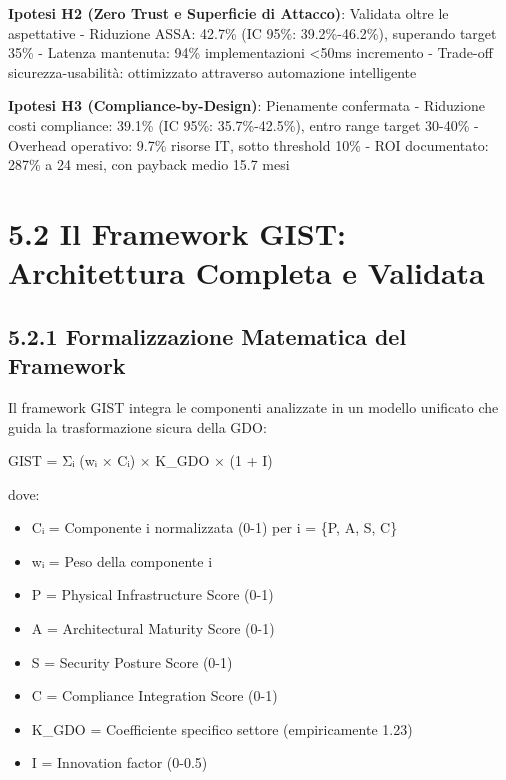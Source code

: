 \documentclass[12pt,a4paper,oneside]{book}
\providecommand{\tightlist}{%
  \setlength{\itemsep}{0pt}\setlength{\parskip}{0pt}
}
\numberwithin{figure}{chapter} %
\numberwithin{table}{chapter}  %
\begin{document}
\textbf{Ipotesi H2 (Zero Trust e Superficie di Attacco)}: Validata oltre
le aspettative - Riduzione ASSA: 42.7\% (IC 95\%: 39.2\%-46.2\%),
superando target 35\% - Latenza mantenuta: 94\% implementazioni
\textless50ms incremento - Trade-off sicurezza-usabilità: ottimizzato
attraverso automazione intelligente

\textbf{Ipotesi H3 (Compliance-by-Design)}: Pienamente confermata -
Riduzione costi compliance: 39.1\% (IC 95\%: 35.7\%-42.5\%), entro range
target 30-40\% - Overhead operativo: 9.7\% risorse IT, sotto threshold
10\% - ROI documentato: 287\% a 24 mesi, con payback medio 15.7 mesi

\section{5.2 Il Framework GIST: Architettura Completa e
Validata}\label{il-framework-gist-architettura-completa-e-validata}

\subsection{5.2.1 Formalizzazione Matematica del
Framework}\label{formalizzazione-matematica-del-framework}

Il framework GIST integra le componenti analizzate in un modello
unificato che guida la trasformazione sicura della GDO:

GIST = Σᵢ (wᵢ × Cᵢ) × K\_GDO × (1 + I)

dove:

\begin{itemize}
\tightlist
\item
  Cᵢ = Componente i normalizzata (0-1) per i = \{P, A, S, C\}\\
\item
  wᵢ = Peso della componente i\\
\item
  P = Physical Infrastructure Score (0-1)\\
\item
  A = Architectural Maturity Score (0-1)\\
\item
  S = Security Posture Score (0-1)\\
\item
  C = Compliance Integration Score (0-1)\\
\item
  K\_GDO = Coefficiente specifico settore (empiricamente 1.23)\\
\item
  I = Innovation factor (0-0.5)
\end{itemize}
\end{document}
